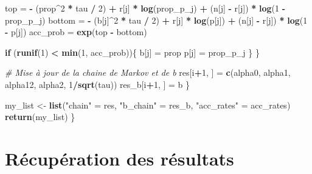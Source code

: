 \documentclass[
]{article}
\newenvironment{Shaded}{\begin{snugshade}}{\end{snugshade}}
\newcommand{\CommentTok}[1]{\textcolor[rgb]{0.56,0.35,0.01}{\textit{#1}}}
\newcommand{\ControlFlowTok}[1]{\textcolor[rgb]{0.13,0.29,0.53}{\textbf{#1}}}
\newcommand{\DecValTok}[1]{\textcolor[rgb]{0.00,0.00,0.81}{#1}}
\newcommand{\FunctionTok}[1]{\textcolor[rgb]{0.13,0.29,0.53}{\textbf{#1}}}
\newcommand{\NormalTok}[1]{#1}
\newcommand{\OtherTok}[1]{\textcolor[rgb]{0.56,0.35,0.01}{#1}}
\newcommand{\SpecialCharTok}[1]{\textcolor[rgb]{0.81,0.36,0.00}{\textbf{#1}}}
\newcommand{\StringTok}[1]{\textcolor[rgb]{0.31,0.60,0.02}{#1}}
\begin{document}
\begin{Shaded}
\begin{Highlighting}[]
\NormalTok{      top }\OtherTok{=} \SpecialCharTok{{-}}\NormalTok{ (prop}\SpecialCharTok{\^{}}\DecValTok{2} \SpecialCharTok{*}\NormalTok{ tau }\SpecialCharTok{/} \DecValTok{2}\NormalTok{) }\SpecialCharTok{+}\NormalTok{ r[j] }\SpecialCharTok{*} \FunctionTok{log}\NormalTok{(prop\_p\_j) }\SpecialCharTok{+}\NormalTok{ (n[j] }\SpecialCharTok{{-}}\NormalTok{ r[j]) }\SpecialCharTok{*} \FunctionTok{log}\NormalTok{(}\DecValTok{1} \SpecialCharTok{{-}}\NormalTok{ prop\_p\_j)}
\NormalTok{      bottom }\OtherTok{=} \SpecialCharTok{{-}}\NormalTok{ (b[j]}\SpecialCharTok{\^{}}\DecValTok{2} \SpecialCharTok{*}\NormalTok{ tau }\SpecialCharTok{/} \DecValTok{2}\NormalTok{) }\SpecialCharTok{+}\NormalTok{ r[j] }\SpecialCharTok{*} \FunctionTok{log}\NormalTok{(p[j]) }\SpecialCharTok{+}\NormalTok{ (n[j] }\SpecialCharTok{{-}}\NormalTok{ r[j]) }\SpecialCharTok{*} \FunctionTok{log}\NormalTok{(}\DecValTok{1} \SpecialCharTok{{-}}\NormalTok{ p[j])}
\NormalTok{      acc\_prob }\OtherTok{=} \FunctionTok{exp}\NormalTok{(top }\SpecialCharTok{{-}}\NormalTok{ bottom)}
      
      \ControlFlowTok{if}\NormalTok{ (}\FunctionTok{runif}\NormalTok{(}\DecValTok{1}\NormalTok{) }\SpecialCharTok{\textless{}} \FunctionTok{min}\NormalTok{(}\DecValTok{1}\NormalTok{, acc\_prob))\{}
\NormalTok{        b[j] }\OtherTok{=}\NormalTok{ prop}
\NormalTok{        p[j] }\OtherTok{=}\NormalTok{ prop\_p\_j}
\NormalTok{      \}}
\NormalTok{    \}}
    
    \CommentTok{\# Mise à jour de la chaine de Markov et de b}
\NormalTok{    res[i}\SpecialCharTok{+}\DecValTok{1}\NormalTok{, ] }\OtherTok{=} \FunctionTok{c}\NormalTok{(alpha0, alpha1, alpha12, alpha2, }\DecValTok{1}\SpecialCharTok{/}\FunctionTok{sqrt}\NormalTok{(tau))}
\NormalTok{    res\_b[i}\SpecialCharTok{+}\DecValTok{1}\NormalTok{, ] }\OtherTok{=}\NormalTok{ b}
\NormalTok{  \}}
  
\NormalTok{  my\_list }\OtherTok{\textless{}{-}} \FunctionTok{list}\NormalTok{(}\StringTok{"chain"} \OtherTok{=}\NormalTok{ res, }\StringTok{"b\_chain"} \OtherTok{=}\NormalTok{ res\_b, }\StringTok{"acc\_rates"} \OtherTok{=}\NormalTok{ acc\_rates)}
  \FunctionTok{return}\NormalTok{(my\_list)}
\NormalTok{\}}
\end{Highlighting}
\end{Shaded}

\hypertarget{ruxe9cupuxe9ration-des-ruxe9sultats}{%
\section{Récupération des
résultats}\label{ruxe9cupuxe9ration-des-ruxe9sultats}}
\end{document}
